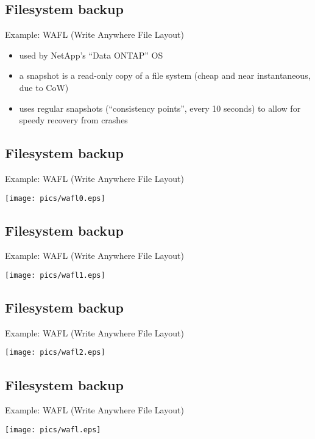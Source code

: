 \documentclass[xga]{xdvislides}
\begin{document}
\subsection{Filesystem backup}
Example: WAFL (Write Anywhere File Layout)
\begin{itemize}
	\item used by NetApp's ``Data ONTAP'' OS
	\item a snapshot is a read-only copy of a file system (cheap and near
		instantaneous, due to CoW)
	\item uses regular snapshots (``consistency points'', every 10 seconds)
		to allow for speedy recovery from crashes
\end{itemize}

\subsection{Filesystem backup}
Example: WAFL (Write Anywhere File Layout)
\vspace*{\fill}
\begin{center}
	\texttt{[image: pics/wafl0.eps]}
\end{center}
\vspace*{\fill}


\subsection{Filesystem backup}
Example: WAFL (Write Anywhere File Layout)
\vspace*{\fill}
\begin{center}
	\texttt{[image: pics/wafl1.eps]}
\end{center}
\vspace*{\fill}


\subsection{Filesystem backup}
Example: WAFL (Write Anywhere File Layout)
\vspace*{\fill}
\begin{center}
	\texttt{[image: pics/wafl2.eps]}
\end{center}
\vspace*{\fill}


\subsection{Filesystem backup}
Example: WAFL (Write Anywhere File Layout)
\vspace*{\fill}
\begin{center}
	\texttt{[image: pics/wafl.eps]}
\end{center}
\vspace*{\fill}
\end{document}

